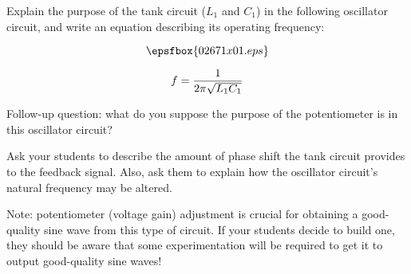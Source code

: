 

Explain the purpose of the tank circuit ($L_1$ and $C_1$) in the following oscillator circuit, and write an equation describing its operating frequency:

$$\epsfbox{02671x01.eps}$$







$$f = {1 \over {2 \pi \sqrt{L_1 C_1}}}$$

\vskip 10pt

Follow-up question: what do you suppose the purpose of the potentiometer is in this oscillator circuit?







Ask your students to describe the amount of phase shift the tank circuit provides to the feedback signal.  Also, ask them to explain how the oscillator circuit's natural frequency may be altered.

Note: potentiometer (voltage gain) adjustment is crucial for obtaining a good-quality sine wave from this type of circuit.  If your students decide to build one, they should be aware that some experimentation will be required to get it to output good-quality sine waves!




